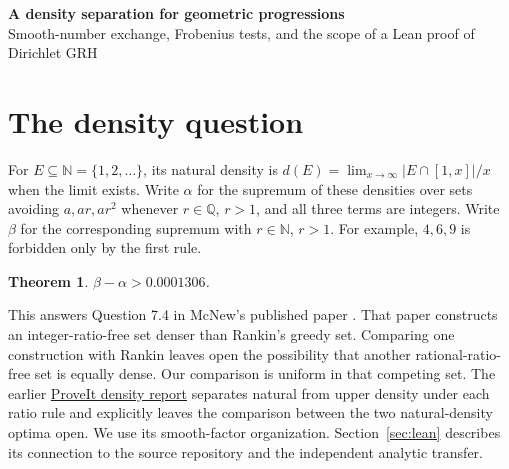 \documentclass[11pt]{article}
\newtheorem{theorem}{Theorem}[section]\newtheorem{lemma}[theorem]{Lemma}\newtheorem{corollary}[theorem]{Corollary}
\newcommand{\Q}{\mathbb Q}\newcommand{\N}{\mathbb N}\newcommand{\R}{\mathbb R}
\newcommand{\prior}[2]{\href{https://github.com/VladimirReshetnikov/ProveIt/blob/5cc267af75a635199ac5d93a7d49cbce521daefc/docs/incoming/#1}{#2}}
\begin{document}
\vspace{0.6em}
\begin{flushleft}{\LARGE\bfseries A density separation for geometric progressions}\\[0.35em]
{\large Smooth-number exchange, Frobenius tests, and the scope of a Lean proof of Dirichlet GRH}
\end{flushleft}
\begin{abstract}
McNew asked whether forbidding all three-term geometric progressions of rational ratio reduces the largest possible natural density strictly below the corresponding supremum for integer ratios. We prove that the difference exceeds $0.0001306$. A replacement on integers supported at $2,3,5$ gains reciprocal mass against every rational-ratio competitor, even after paying for new progressions that cross the replacement boundary. Two exact finite certificates and a smooth-factor density argument give the result. We also determine three restricted Rankin optima, including all ratios supported on $2,3,5,7$. These theorems are unconditional. A separate transfer from the one-sided zero test in \texttt{grh-lean} classifies binary Frobenius weights having strictly negative coefficients on every nonlinear irreducible and produces a single prime-counting criterion for Dedekind RH. The arithmetic estimate required by that criterion remains open.
\end{abstract}
\section{The density question}
For $E\subseteq\N=\{1,2,\dots\}$, its natural density is $d(E)=\lim_{x\to\infty}|E\cap[1,x]|/x$ when the limit exists. Write $\alpha$ for the supremum of these densities over sets avoiding $a,ar,ar^2$ whenever $r\in\Q$, $r>1$, and all three terms are integers. Write $\beta$ for the corresponding supremum with $r\in\N$, $r>1$. For example, $4,6,9$ is forbidden only by the first rule.
\begin{theorem}\label{t:gap}
$\displaystyle\beta-\alpha>0.0001306$.
\end{theorem}
This answers Question 7.4 in McNew's published paper \cite{mcnew}. That paper constructs an integer-ratio-free set denser than Rankin's greedy set. Comparing one construction with Rankin leaves open the possibility that another rational-ratio-free set is equally dense. Our comparison is uniform in that competing set. The earlier \prior{grh_transfers_density_gaps_and_zero_tests.zip}{ProveIt density report} separates natural from upper density under each ratio rule and explicitly leaves the comparison between the two natural-density optima open. We use its smooth-factor organization. Section~\ref{sec:lean} describes its connection to the source repository and the independent analytic transfer.
\end{document}
